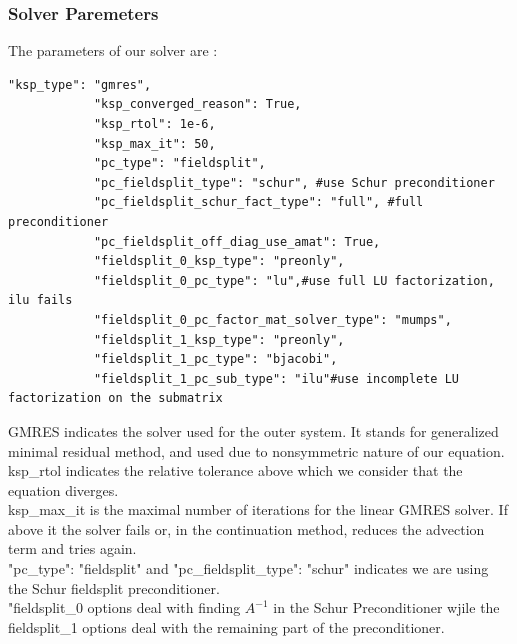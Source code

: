 \documentclass[11pt,twoside,a4paper]{article}
\begin{document}
\subsubsection{Solver Paremeters}
The parameters of our solver are :
\begin{lstlisting}
"ksp_type": "gmres",
            "ksp_converged_reason": True,
            "ksp_rtol": 1e-6,
            "ksp_max_it": 50,
            "pc_type": "fieldsplit",
            "pc_fieldsplit_type": "schur", #use Schur preconditioner
            "pc_fieldsplit_schur_fact_type": "full", #full preconditioner
            "pc_fieldsplit_off_diag_use_amat": True,
            "fieldsplit_0_ksp_type": "preonly",
            "fieldsplit_0_pc_type": "lu",#use full LU factorization, ilu fails
            "fieldsplit_0_pc_factor_mat_solver_type": "mumps",
            "fieldsplit_1_ksp_type": "preonly",
            "fieldsplit_1_pc_type": "bjacobi",
            "fieldsplit_1_pc_sub_type": "ilu"#use incomplete LU factorization on the submatrix
\end{lstlisting}
GMRES indicates the solver used for the outer system.
 It stands for generalized minimal residual method, and used due to nonsymmetric nature of our equation.\\
ksp\_rtol indicates the relative tolerance above which we consider that the equation diverges.\\
ksp\_max\_it is the maximal number of iterations for the linear GMRES solver. If above it the solver fails or, in the continuation method, reduces the advection term and tries again.\\
"pc\_type": "fieldsplit" and "pc\_fieldsplit\_type": "schur" indicates we are using the Schur fieldsplit preconditioner.\\
"fieldsplit\_0 options deal with finding $A^{-1}$ in the Schur Preconditioner wjile the fieldsplit\_1 options deal with the remaining part of the preconditioner.
\end{document}
